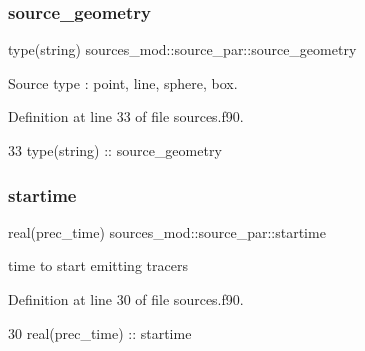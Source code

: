 \subsubsection{\texorpdfstring{source\+\_\+geometry}{source\_geometry}}
{\footnotesize\ttfamily type(string) sources\+\_\+mod\+::source\+\_\+par\+::source\+\_\+geometry\hspace{0.3cm}{\ttfamily [private]}}



Source type \+: \textquotesingle{}point\textquotesingle{}, \textquotesingle{}line\textquotesingle{}, \textquotesingle{}sphere\textquotesingle{}, \textquotesingle{}box\textquotesingle{}. 



Definition at line 33 of file sources.\+f90.


\begin{DoxyCode}
33         \textcolor{keywordtype}{type}(string) :: source\_geometry
\end{DoxyCode}
\mbox{\label{structsources__mod_1_1source__par_afcde2655b2a557f3a3e2c952dc8a51b0}} 
\subsubsection{\texorpdfstring{startime}{startime}}
{\footnotesize\ttfamily real(prec\+\_\+time) sources\+\_\+mod\+::source\+\_\+par\+::startime\hspace{0.3cm}{\ttfamily [private]}}



time to start emitting tracers 



Definition at line 30 of file sources.\+f90.


\begin{DoxyCode}
30         \textcolor{keywordtype}{real(prec\_time)} :: startime
\end{DoxyCode}
\mbox{\label{structsources__mod_1_1source__par_ac2c04f0d36ad034e160e3de15fe0c283}} 
